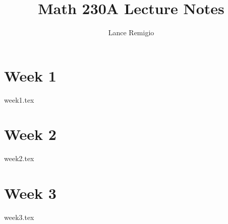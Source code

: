 \documentclass[a4paper]{report}
\title{Math 230A Lecture Notes}
\author{Lance Remigio}
\begin{document}
\maketitle 
\tableofcontents

\chapter{Week 1}

{week1.tex}

\chapter{Week 2}

{week2.tex}

\chapter{Week 3}

{week3.tex}
\end{document}
